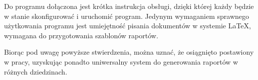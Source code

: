Do programu dołączona jest krótka instrukcja obsługi, dzięki której każdy będzie w stanie skonfigurować i uruchomić program. Jedynym wymaganiem sprawnego użytkowania programu jest umiejętność pisania dokumentów w systemie LaTeX, wymagana do przygotowania szablonów raportów.
\vspace{5mm}

Biorąc pod uwagę powyższe stwierdzenia, można uznać, że osiągnięto postawiony w pracy, uzyskując ponadto uniwersalny system do generowania raportów w różnych dziedzinach.